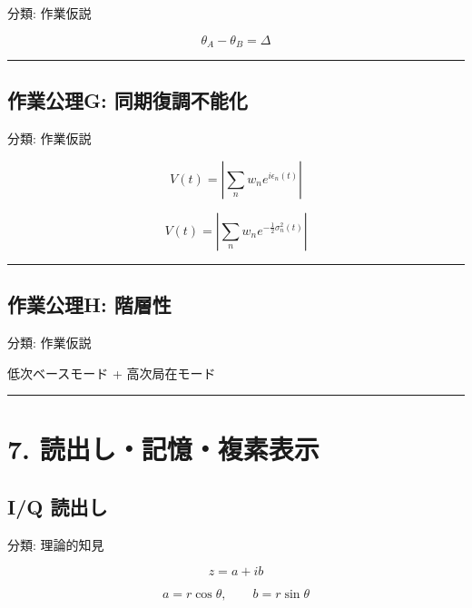 \documentclass[
  a4paper,
]{ltjsarticle}
\newenvironment{Shaded}{}{}
\newcommand{\NormalTok}[1]{#1}
\begin{document}
分類: 作業仮説

\[
\theta_A-\theta_B=\Delta
\]

\begin{center}\rule{0.5\linewidth}{0.5pt}\end{center}

\subsection{作業公理G:
同期復調不能化}\label{ux4f5cux696dux516cux7406g-ux540cux671fux5fa9ux8abfux4e0dux80fdux5316}

分類: 作業仮説

\[
V(t)=\left|\sum_n w_n e^{i\epsilon_n(t)}\right|
\]

\[
V(t)=\left|\sum_n w_n e^{-\frac12\sigma_n^2(t)}\right|
\]

\begin{center}\rule{0.5\linewidth}{0.5pt}\end{center}

\subsection{作業公理H:
階層性}\label{ux4f5cux696dux516cux7406h-ux968eux5c64ux6027}

分類: 作業仮説

\begin{Shaded}
\begin{Highlighting}[]
\NormalTok{低次ベースモード}
\NormalTok{+ 高次局在モード}
\end{Highlighting}
\end{Shaded}

\begin{center}\rule{0.5\linewidth}{0.5pt}\end{center}

\section{7.
読出し・記憶・複素表示}\label{ux8aadux51faux3057ux8a18ux61b6ux8907ux7d20ux8868ux793a}

\subsection{I/Q 読出し}\label{iq-ux8aadux51faux3057}

分類: 理論的知見

\[
z=a+ib
\]

\[
a=r\cos\theta,\qquad b=r\sin\theta
\]
\end{document}

